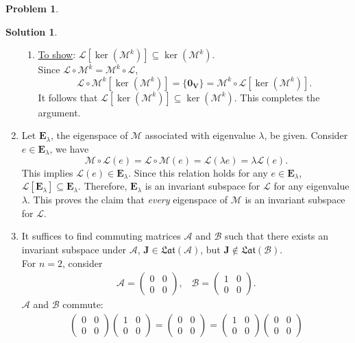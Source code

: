 \documentclass{book}
\theoremstyle{definition}
\newtheorem*{prob*}{Problem}
\newtheorem*{sln*}{Solution}
\newcommand{\V}{\mathbf{V}}
\newcommand{\lag}{\mathcal{L}}
\newcommand{\J}{\mathbf{J}}
\newcommand{\M}{\mathcal{M}}
\begin{document}
\begin{prob*}
\begin{sln*}
\begin{enumerate}
\begin{enumerate}
				\item \underline{To show}: $\lag[\ker(\M^k)] \subseteq \ker(\M^k)$. \\
				
				Since $\lag\circ \M^k = \M^k \circ \lag$, $$\lag\circ \M^k[\ker(\M^k)] = \{\mathbf{0}_\V\} = \M^k \circ \lag[\ker(\M^k)].$$ It follows that $\lag[\ker(\M^k)] \subseteq \ker(\M^k)$. This completes the argument.\\
			\end{enumerate}
			
			
			\item Let $\mathbf{E}_\lambda$, the eigenspace of $\M$ associated with eigenvalue $\lambda$, be given. Consider $e \in \mathbf{E}_\lambda$, we have $$\M\circ \lag(e) = \lag \circ \M(e) = \lag(\lambda e) = \lambda \lag(e).$$ This implies $\lag(e) \in \mathbf{E}_\lambda$. Since this relation holds for any $e\in \mathbf{E}_\lambda$, $\lag[\mathbf{E}_\lambda] \subseteq \mathbf{E}_\lambda$. Therefore, $\mathbf{E}_\lambda$ is an invariant subspace for $\lag$ for any eigenvalue $\lambda$. This proves the claim that \textit{every} eigenspace of $\M$ is an invariant subspace for $\lag$.\\
			
			
			\item It suffices to find commuting matrices $\mathcal{A}$ and $\mathcal{B}$ such that there exists an invariant subspace under $\mathcal{A}$, $\J \in \mathfrak{Lat}(\mathcal{A})$, but $\J \notin \mathfrak{Lat}(\mathcal{B})$. \\
			
			For $n=2$, consider
			\begin{align*}
			\mathcal{A} = \begin{pmatrix}
			0&0\\
			0&0
			\end{pmatrix},\,\,\,\,\,
			\mathcal{B} = \begin{pmatrix}
			1&0\\
			0&0
			\end{pmatrix}.
			\end{align*} 
			$\mathcal{A}$ and $\mathcal{B}$ commute:
			\begin{align*}
			\begin{pmatrix}
			0&0\\
			0&0
			\end{pmatrix}\begin{pmatrix}
			1&0\\
			0&0
			\end{pmatrix}=
			\begin{pmatrix}
			0&0\\
			0&0
			\end{pmatrix}
			=
			\begin{pmatrix}
			1&0\\
			0&0
			\end{pmatrix}
			\begin{pmatrix}
			0&0\\
			0&0
			\end{pmatrix}
			\end{align*}
			

\end{enumerate}
\end{sln*}
\end{prob*}
\end{document}
